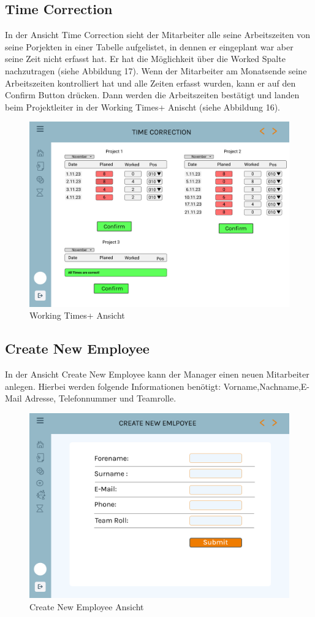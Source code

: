 \documentclass{article}
\begin{document}
\newpage
\clearpage

\subsection{Time Correction}
In der Ansicht Time Correction sieht der Mitarbeiter alle seine Arbeitszeiten
von seine Porjekten in einer Tabelle aufgelistet, in dennen er eingeplant war
aber seine Zeit nicht erfasst hat. Er hat die Möglichkeit über die Worked
Spalte nachzutragen (siehe Abbildung 17). Wenn der Mitarbeiter am Monatsende
seine Arbeitszeiten kontrolliert hat und alle Zeiten erfasst wurden, kann er
auf den Confirm Button drücken. Dann werden die Arbeitszeiten bestätigt und
landen beim Projektleiter in der Working Times+ Anischt (siehe Abbildung 16).

\begin{figure}[]
    \includegraphics[height= 0.5\textwidth,width= \textwidth]{images/TimeCorrection.png}
    \caption{Working Times+ Ansicht}
    \label{fig:beispiel}
\end{figure}

\subsection{Create New Employee}
In der Ansicht Create New Employee kann der Manager einen neuen Mitarbeiter
anlegen. Hierbei werden folgende Informationen benötigt:
Vorname,Nachname,E-Mail Adresse, Telefonnummer und Teamrolle.

\begin{figure}[h]
    \centering
    \includegraphics[width= \textwidth]{images/CreateNewEmployee.png}
    \caption{Create New Employee Ansicht}
    \label{fig:beispiel}
\end{figure}
\end{document}
